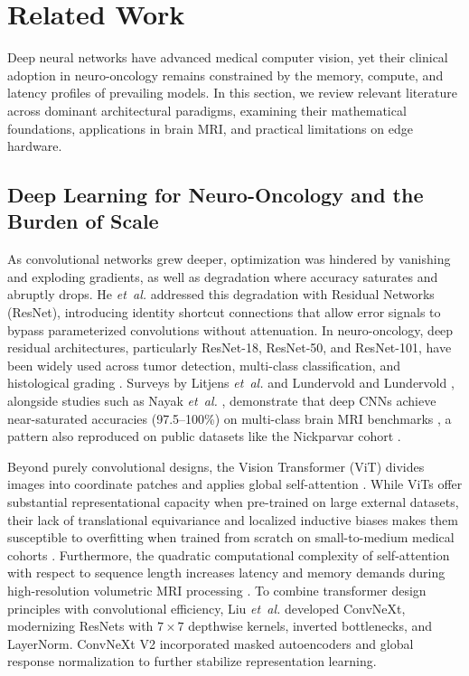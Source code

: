 \documentclass[journal]{IEEEtran}
\begin{document}
\section{Related Work}
\label{sec:related_work}

Deep neural networks have advanced medical computer vision, yet their clinical adoption in neuro-oncology remains constrained by the memory, compute, and latency profiles of prevailing models. In this section, we review relevant literature across dominant architectural paradigms, examining their mathematical foundations, applications in brain MRI, and practical limitations on edge hardware.

\subsection{Deep Learning for Neuro-Oncology and the Burden of Scale}
As convolutional networks grew deeper, optimization was hindered by vanishing and exploding gradients, as well as degradation where accuracy saturates and abruptly drops. He \emph{et~al.} \cite{10} addressed this degradation with Residual Networks (ResNet), introducing identity shortcut connections that allow error signals to bypass parameterized convolutions without attenuation. In neuro-oncology, deep residual architectures, particularly ResNet-18, ResNet-50, and ResNet-101, have been widely used across tumor detection, multi-class classification, and histological grading \cite{7, 28, 38, 39}. Surveys by Litjens \emph{et~al.} \cite{7} and Lundervold and Lundervold \cite{38}, alongside studies such as Nayak \emph{et~al.} \cite{39}, demonstrate that deep CNNs achieve near-saturated accuracies (97.5--100\%) on multi-class brain MRI benchmarks \cite{39}, a pattern also reproduced on public datasets like the Nickparvar cohort \cite{26}.

Beyond purely convolutional designs, the Vision Transformer (ViT) \cite{6} divides images into coordinate patches and applies global self-attention \cite{33}. While ViTs offer substantial representational capacity when pre-trained on large external datasets, their lack of translational equivariance and localized inductive biases makes them susceptible to overfitting when trained from scratch on small-to-medium medical cohorts \cite{19}. Furthermore, the quadratic computational complexity of self-attention with respect to sequence length increases latency and memory demands during high-resolution volumetric MRI processing \cite{6, 46}. To combine transformer design principles with convolutional efficiency, Liu \emph{et~al.} \cite{24} developed ConvNeXt, modernizing ResNets with $7\times7$ depthwise kernels, inverted bottlenecks, and LayerNorm. ConvNeXt V2 \cite{34} incorporated masked autoencoders and global response normalization to further stabilize representation learning.
\end{document}
